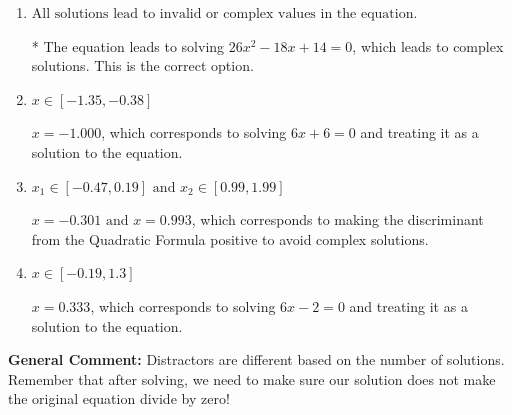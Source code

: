 \documentclass{extbook}[14pt]
\begin{document}
\begin{enumerate}
{\begin{enumerate}[label=\Alph*.]
$x = 0.333 \text{ and } x = -1.000$, which corresponds to solving $6x -2 = 0$ and $6x + 6 = 0$ and treating them as solutions to the equation.
\item \( \text{All solutions lead to invalid or complex values in the equation.} \)

* The equation leads to solving $26x^{2} -18 x + 14=0$, which leads to complex solutions. This is the correct option.
\item \( x \in [-1.35,-0.38] \)

$x = -1.000$, which corresponds to solving $6x + 6 = 0$ and treating it as a solution to the equation.
\item \( x_1 \in [-0.47, 0.19] \text{ and } x_2 \in [0.99,1.99] \)

$x = -0.301 \text{ and } x = 0.993$, which corresponds to making the discriminant from the Quadratic Formula positive to avoid complex solutions.
\item \( x \in [-0.19,1.3] \)

$x = 0.333$, which corresponds to solving $6x -2 = 0$ and treating it as a solution to the equation.
\end{enumerate}

\textbf{General Comment:} Distractors are different based on the number of solutions. Remember that after solving, we need to make sure our solution does not make the original equation divide by zero!
}
\end{enumerate}
\end{document}
